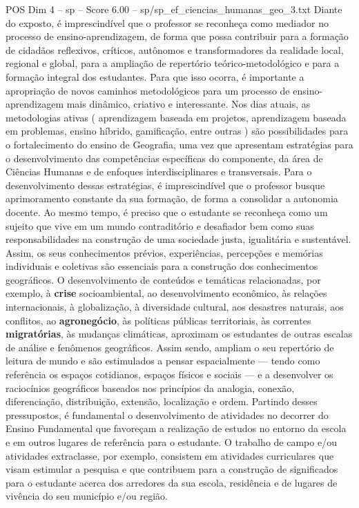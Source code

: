 \begin{textsample}{POS Dim 4 – sp – Score 6.00 – sp/sp\_ef\_ciencias\_humanas\_geo\_3.txt}  \label{ex:f4_pos_254}
Diante do exposto, é imprescindível que o professor se reconheça como mediador no processo de ensino-aprendizagem, de forma que possa contribuir para a formação de cidadãos reflexivos, críticos, autônomos e transformadores da realidade local, regional e global, para a ampliação de repertório teórico-metodológico e para a formação integral dos estudantes.
Para que isso ocorra, é importante a apropriação de novos caminhos metodológicos para um processo de ensino-aprendizagem mais dinâmico, criativo e interessante.
Nos dias atuais, as metodologias ativas ( aprendizagem baseada em projetos, aprendizagem baseada em problemas, ensino híbrido, gamificação, entre outras ) são possibilidades para o fortalecimento do ensino de Geografia, uma vez que apresentam estratégias para o desenvolvimento das competências específicas do componente, da área de Ciências Humanas e de enfoques interdisciplinares e transversais.
Para o desenvolvimento dessas estratégias, é imprescindível que o professor busque aprimoramento constante da sua formação, de forma a consolidar a autonomia docente.
Ao mesmo tempo, é preciso que o estudante se reconheça como um sujeito que vive em um mundo contraditório e desafiador bem como suas responsabilidades na construção de uma sociedade justa, igualitária e sustentável.
Assim, os seus conhecimentos prévios, experiências, percepções e memórias individuais e coletivas são essenciais para a construção dos conhecimentos geográficos.
O desenvolvimento de conteúdos e temáticas relacionadas, por exemplo, à \textbf{crise} socioambiental, ao desenvolvimento econômico, às relações internacionais, à globalização, à diversidade cultural, aos desastres naturais, aos conflitos, ao \textbf{agronegócio}, às políticas públicas territoriais, às correntes \textbf{migratórias}, às mudanças climáticas, aproximam os estudantes de outras escalas de análise e fenômenos geográficos.
Assim sendo, ampliam o seu repertório de leitura de mundo e são estimulados a pensar espacialmente — tendo como referência os espaços cotidianos, espaços físicos e sociais — e a desenvolver os raciocínios geográficos baseados nos princípios da analogia, conexão, diferenciação, distribuição, extensão, localização e ordem.
Partindo desses pressupostos, é fundamental o desenvolvimento de atividades no decorrer do Ensino Fundamental que favoreçam a realização de estudos no entorno da escola e em outros lugares de referência para o estudante.
O trabalho de campo e/ou atividades extraclasse, por exemplo, consistem em atividades curriculares que visam estimular a pesquisa e que contribuem para a construção de significados para o estudante acerca dos arredores da sua escola, residência e de lugares de vivência do seu município e/ou região.

\end{textsample}
